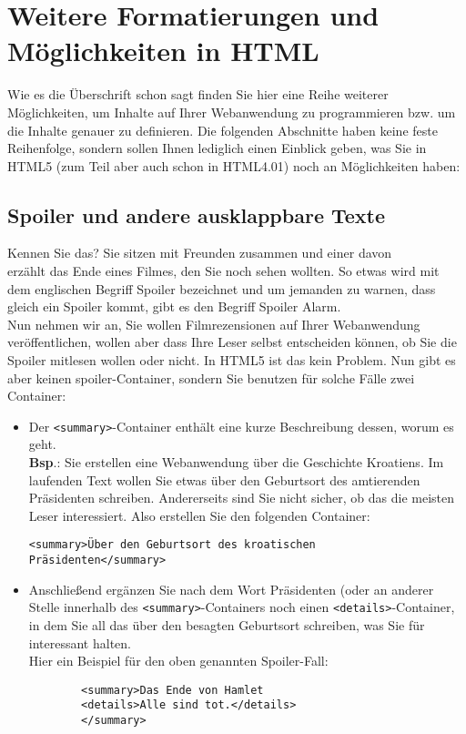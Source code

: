 \section{Weitere Formatierungen und Möglichkeiten in HTML}

Wie es die Überschrift schon sagt finden Sie hier eine Reihe weiterer \\Möglichkeiten, um Inhalte auf Ihrer Webanwendung zu programmieren bzw. um die Inhalte genauer zu definieren. Die folgenden Abschnitte haben keine feste Reihenfolge, sondern sollen Ihnen lediglich einen Einblick geben, was Sie in HTML5 (zum Teil aber auch schon in HTML4.01) noch an Möglichkeiten haben:

\subsection{Spoiler und andere ausklappbare Texte}

Kennen Sie das? Sie sitzen mit Freunden zusammen und einer davon\\ erzählt das Ende eines Filmes, den Sie noch sehen wollten. So etwas wird mit dem englischen Begriff Spoiler bezeichnet und um jemanden zu warnen, dass gleich ein Spoiler kommt, gibt es den Begriff Spoiler Alarm.\\

Nun nehmen wir an, Sie wollen Filmrezensionen auf Ihrer Webanwendung veröffentlichen, wollen aber dass Ihre Leser selbst entscheiden können, ob Sie die Spoiler mitlesen wollen oder nicht. In HTML5 ist das kein Problem. Nun gibt es aber keinen spoiler-Container, sondern Sie benutzen für solche Fälle zwei Container:

\begin{itemize}
	\item Der \verb|<summary>|-Container enthält eine kurze Beschreibung dessen, worum es geht. \\	
	\textbf{Bsp}.: Sie erstellen eine Webanwendung über die Geschichte Kroatiens. Im laufenden Text wollen Sie etwas über den Geburtsort des amtierenden Präsidenten schreiben. Andererseits sind Sie nicht sicher, ob das die meisten Leser interessiert. Also erstellen Sie den folgenden Container:
	
	\verb|<summary>Über den Geburtsort des kroatischen|\\\verb|Präsidenten</summary>|
	
	\item Anschließend ergänzen Sie nach dem Wort Präsidenten (oder an anderer Stelle innerhalb des \verb|<summary>|-Containers noch einen \verb|<details>|-Container, in dem Sie all das über den besagten Geburtsort schreiben, was Sie für interessant halten.\\	
	Hier ein Beispiel für den oben genannten Spoiler-Fall:
	
	\begin{verbatim}
		<summary>Das Ende von Hamlet
		<details>Alle sind tot.</details>
		</summary>
	\end{verbatim}
	
\end{itemize}


